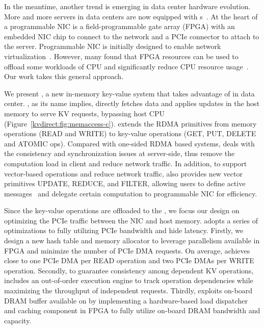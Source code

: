 In the meantime, another trend is emerging in data center hardware evolution. More and more servers in data centers are now equipped with \ournic{}s~\cite{caulfield2016cloud, greenberg2015sdn,putnam2014reconfigurable}.
At the heart of a programmable NIC is a field-programmable gate array (FPGA) with an embedded NIC chip to connect to the network and a PCIe connector to attach to the server.
Programmable NIC is initially designed to enable network virtualization~\cite{vfp,li2016clicknp}.
However, many found that FPGA resources can be used to offload some workloads of CPU and significantly reduce CPU resource usage~\cite{ouyang14hotchips, MaZC17fpga, huang16socc, cong16dac}. Our work takes this general approach.

We present \oursys{}, a new in-memory key-value system that takes advantage of \ournic{} in data center.
\oursys{}, as its name implies, directly fetches data and applies updates in the host memory to serve KV requests, bypassing host CPU (Figure~\ref{kvdirect:fig:memaccess-c}).
\oursys{} extends the RDMA primitives from memory operations (READ and WRITE) to key-value operations (GET, PUT, DELETE and ATOMIC ops). Compared with one-sided RDMA based systems, \oursys{} deals with the consistency and synchronization issues at server-side, thus remove the computation load in client and reduce network traffic.
In addition, to support vector-based operations and reduce network traffic, \oursys{} also provides new vector primitives UPDATE, REDUCE, and FILTER, allowing users to define active messages~\cite{eicken1992active} and delegate certain computation to programmable NIC for efficiency.

Since the key-value operations are offloaded to the \ournic{}, we focus our design on optimizing the PCIe traffic between the NIC and host memory. \oursys{} adopts a series of optimizations to fully utilizing PCIe bandwidth and hide latency. Firstly, we design a new hash table and memory allocator to leverage parallelism available in FPGA and minimize the number of PCIe DMA requests. On average, \oursys{} achieves close to one PCIe DMA per READ operation and two PCIe DMAs per WRITE operation. Secondly, to guarantee consistency among dependent KV operations, \oursys{} includes an out-of-order execution engine to track operation dependencies while maximizing the throughput of independent requests. Thirdly, \oursys{} exploits on-board DRAM buffer available on \ournic{} by implementing a hardware-based load dispatcher and caching component in FPGA to fully utilize on-board DRAM bandwidth and capacity. 

